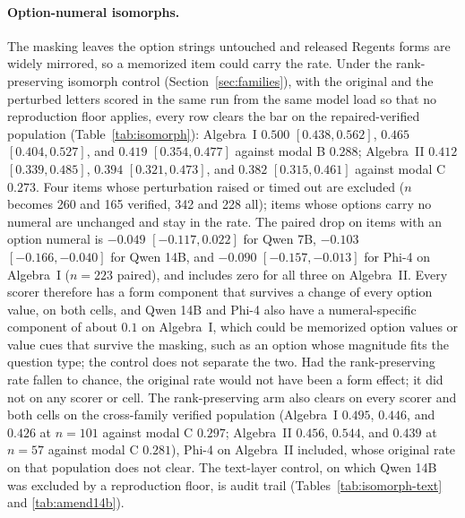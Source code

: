 \paragraph{Option-numeral isomorphs.}
The masking leaves the option strings untouched and released Regents forms are widely mirrored, so a memorized item could carry the rate. Under the rank-preserving isomorph control (Section~\ref{sec:families}), with the original and the perturbed letters scored in the same run from the same model load so that no reproduction floor applies, every row clears the bar on the repaired-verified population (Table~\ref{tab:isomorph}): Algebra~I $0.500$ $[0.438, 0.562]$, $0.465$ $[0.404, 0.527]$, and $0.419$ $[0.354, 0.477]$ against modal B $0.288$; Algebra~II $0.412$ $[0.339, 0.485]$, $0.394$ $[0.321, 0.473]$, and $0.382$ $[0.315, 0.461]$ against modal C $0.273$. Four items whose perturbation raised or timed out are excluded ($n$ becomes 260 and 165 verified, 342 and 228 all); items whose options carry no numeral are unchanged and stay in the rate. The paired drop on items with an option numeral is $-0.049$ $[-0.117, 0.022]$ for Qwen 7B, $-0.103$ $[-0.166, -0.040]$ for Qwen 14B, and $-0.090$ $[-0.157, -0.013]$ for Phi-4 on Algebra~I ($n=223$ paired), and includes zero for all three on Algebra~II. Every scorer therefore has a form component that survives a change of every option value, on both cells, and Qwen 14B and Phi-4 also have a numeral-specific component of about $0.1$ on Algebra~I, which could be memorized option values or value cues that survive the masking, such as an option whose magnitude fits the question type; the control does not separate the two. Had the rank-preserving rate fallen to chance, the original rate would not have been a form effect; it did not on any scorer or cell. The rank-preserving arm also clears on every scorer and both cells on the cross-family verified population (Algebra~I $0.495$, $0.446$, and $0.426$ at $n=101$ against modal C $0.297$; Algebra~II $0.456$, $0.544$, and $0.439$ at $n=57$ against modal C $0.281$), Phi-4 on Algebra~II included, whose original rate on that population does not clear. The text-layer control, on which Qwen 14B was excluded by a reproduction floor, is audit trail (Tables~\ref{tab:isomorph-text} and \ref{tab:amend14b}).

